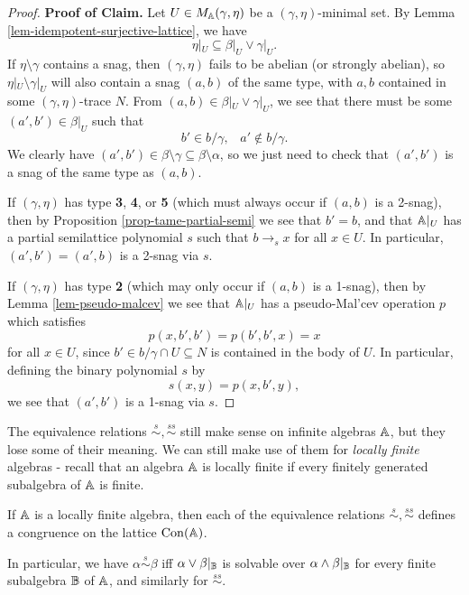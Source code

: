\begin{appendices}
\begin{proof}
{\bf Proof of Claim.} Let $U \in M_{\mathbb{A}}(\gamma, \eta)$ be a $(\gamma, \eta)$-minimal set. By Lemma \ref{lem-idempotent-surjective-lattice}, we have
\[
\eta|_U \subseteq \beta|_U \vee \gamma|_U.
\]
If $\eta \setminus \gamma$ contains a snag, then $(\gamma, \eta)$ fails to be abelian (or strongly abelian), so $\eta|_U \setminus \gamma|_U$ will also contain a snag $(a,b)$ of the same type, with $a,b$ contained in some $(\gamma, \eta)$-trace $N$. From $(a,b) \in \beta|_U \vee \gamma|_U$, we see that there must be some $(a', b') \in \beta|_U$ such that
\[
b' \in b/\gamma, \;\;\; a' \not\in b/\gamma.
\]
We clearly have $(a',b') \in \beta \setminus \gamma \subseteq \beta \setminus \alpha$, so we just need to check that $(a',b')$ is a snag of the same type as $(a,b)$.

If $(\gamma, \eta)$ has type \textbf{3}, \textbf{4}, or \textbf{5} (which must always occur if $(a,b)$ is a 2-snag), then by Proposition \ref{prop-tame-partial-semi} we see that $b' = b$, and that $\mathbb{A}|_U$ has a partial semilattice polynomial $s$ such that $b \rightarrow_s x$ for all $x \in U$. In particular, $(a',b') = (a',b)$ is a 2-snag via $s$.

If $(\gamma, \eta)$ has type \textbf{2} (which may only occur if $(a,b)$ is a 1-snag), then by Lemma \ref{lem-pseudo-malcev} we see that $\mathbb{A}|_U$ has a pseudo-Mal'cev operation $p$ which satisfies
\[
p(x,b',b') = p(b',b',x) = x
\]
for all $x \in U$, since $b' \in b/\gamma \cap U \subseteq N$ is contained in the body of $U$. In particular, defining the binary polynomial $s$ by
\[
s(x,y) = p(x,b',y),
\]
we see that $(a',b')$ is a 1-snag via $s$.
\end{proof}

The equivalence relations $\stackrel{s}{\sim}, \stackrel{ss}{\sim}$ still make sense on infinite algebras $\mathbb{A}$, but they lose some of their meaning. We can still make use of them for \emph{locally finite} algebras - recall that an algebra $\mathbb{A}$ is locally finite if every finitely generated subalgebra of $\mathbb{A}$ is finite.

\begin{cor} If $\mathbb{A}$ is a locally finite algebra, then each of the equivalence relations $\stackrel{s}{\sim}, \stackrel{ss}{\sim}$ defines a congruence on the lattice $\operatorname{Con}(\mathbb{A})$.

In particular, we have $\alpha \stackrel{s}{\sim} \beta$ iff $\alpha \vee \beta|_{\mathbb{B}}$ is solvable over $\alpha \wedge \beta|_{\mathbb{B}}$ for every finite subalgebra $\mathbb{B}$ of $\mathbb{A}$, and similarly for $\stackrel{ss}{\sim}$.
\end{cor}


\end{appendices}
